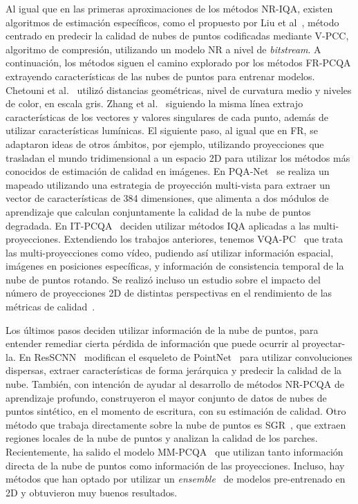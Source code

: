 Al igual que en las primeras aproximaciones de los métodos NR-IQA, existen 
algoritmos de estimación específicos, como el propuesto por Liu et al~\cite{bitstreamPCQ},
método centrado en predecir la calidad de nubes de puntos 
codificadas mediante V-PCC, algoritmo de compresión, utilizando un modelo NR 
a nivel de \emph{bitstream}. A continuación, los métodos siguen el camino explorado 
por los métodos FR-PCQA extrayendo características de las nubes de puntos para 
entrenar modelos.  Chetouni et al.~\cite{NR-CNN-3D-PC} utilizó distancias geométricas, nivel de curvatura medio
y niveles de color, en escala gris. Zhang et al.~\cite{NR3DQA} siguiendo la misma 
línea extrajo características de los vectores y valores singulares de cada punto,
además de utilizar características lumínicas.
El siguiente paso, al igual que en FR, se adaptaron ideas de otros ámbitos, por ejemplo, utilizando 
proyecciones que trasladan el mundo tridimensional a un espacio 2D para utilizar 
los métodos más conocidos de estimación de calidad en imágenes.
En PQA-Net~\cite{PQA-Net} se realiza un mapeado 
utilizando una estrategia de proyección multi-vista para extraer un vector de 
características de 384 dimensiones, que alimenta a dos módulos de aprendizaje 
que calculan conjuntamente la calidad de la nube de puntos degradada. 
En IT-PCQA~\cite{IT-PCQA} deciden utilizar métodos IQA aplicadas a las multi-proyecciones.
Extendiendo los trabajos anteriores, tenemos VQA-PC~\cite{VQA-PC} que trata las 
multi-proyecciones como vídeo, pudiendo así utilizar información espacial, 
imágenes en posiciones específicas, y información de consistencia temporal 
de la nube de puntos rotando. 
Se realizó incluso un estudio sobre el impacto del número de proyecciones 2D de 
distintas perspectivas en el rendimiento de las métricas de calidad~\cite{ImpactOf2DProyections, IT-PCQA}.

Los últimos pasos deciden utilizar información de la nube de puntos, para 
entender remediar cierta pérdida de información que puede ocurrir al proyectar-la. 
En ResSCNN~\cite{ResSCNN} modifican el esqueleto de PointNet~\cite{PointNet} para 
utilizar convoluciones dispersas, extraer características de forma jerárquica y 
predecir la calidad de la nube. También, con intención de ayudar al desarrollo 
de métodos NR-PCQA de aprendizaje profundo, construyeron el mayor conjunto de datos
de nubes de puntos sintético, en el momento de escritura, con su estimación de calidad. 
Otro método que trabaja directamente sobre la nube de puntos es SGR~\cite{SGR}, 
que extraen regiones locales de la nube de puntos y analizan la calidad de los parches.
Recientemente, ha salido el modelo MM-PCQA~\cite{MM-PCQA} que utilizan tanto información 
directa de la nube de puntos como información de las proyecciones. Incluso, hay 
métodos que han optado por utilizar un \emph{ensemble}~\cite{EnsemblePCQA} de 
modelos pre-entrenado en 2D y obtuvieron muy buenos resultados. 

